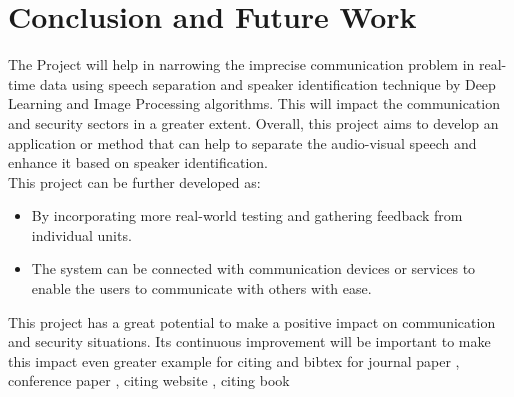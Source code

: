 \documentclass[12pt,a4paper]{report}
\begin{document}
\chapter{Conclusion and Future Work}
\cite{bashir2021subjective} \cite{mittal2016}
The Project will help in narrowing the imprecise communication problem in real-time data using 
speech separation and speaker identification technique by Deep Learning and Image Processing 
algorithms. This will impact the communication and security sectors in a greater extent. Overall, this 
project aims to develop an application or method that can help to separate the audio-visual speech and 
enhance it based on speaker identification.
\\
This project can be further developed as:
\begin{itemize}
    \item By incorporating more real-world testing and gathering feedback from individual units.
    \item  The system can be connected with communication devices or services to enable the users to communicate with others with ease.
\end{itemize}


\cite{Tea} This project has a great potential to make a positive impact on communication and security situations. Its continuous improvement will be important to make this impact 
even greater example for citing and bibtex for journal paper \cite{croitoru2023diffusion}, conference paper \cite{mohamad2015smart}, citing website \cite{knuthwebsite}, citing book \cite{dirac}








\newpage

\pagestyle{plain}
\renewcommand{\bibname}{References}


\printbibliography
\end{document}
